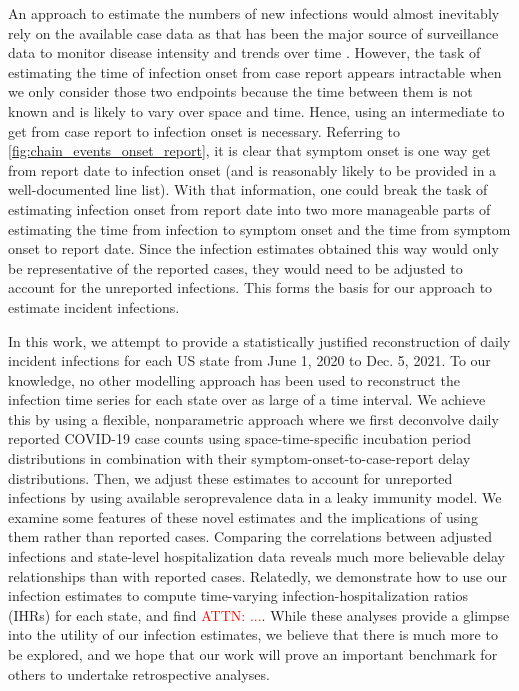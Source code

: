 \documentclass{article}
\newcommand{\attn}[1]{\textcolor{red}{ATTN: #1}}
\begin{document}
An approach to estimate the numbers of new infections would almost inevitably rely on the available case data as that has been the major source of surveillance data to monitor disease intensity and trends over time \citep{ecdc2020strategies}. However, the task of estimating the time of infection onset from case report appears intractable when we only consider those two endpoints because the time between them is not known and is likely to vary over space and time. Hence, using an intermediate to get from case report to infection onset is necessary. Referring to \autoref{fig:chain_events_onset_report}, it is clear that symptom onset is one way get from report date to infection onset (and is reasonably likely to be provided in a well-documented line list). With that information, one could break the task of estimating infection onset from report date into two more manageable parts of estimating the time from infection to symptom onset and the time from symptom onset to report date. Since the infection estimates obtained this way would only be representative of the reported cases, they would need to be adjusted to account for the unreported infections. This forms the basis for our approach to estimate incident infections.


In this work, we attempt to provide a statistically justified reconstruction of daily incident infections for each US state from June 1, 2020 to Dec. 5, 2021. To our knowledge, no other modelling approach has been used to reconstruct the infection time series for each state over as large of a time interval. We achieve this by using a flexible, nonparametric approach where we first deconvolve daily reported COVID-19 case counts using space-time-specific incubation period distributions in combination with their symptom-onset-to-case-report delay distributions. Then, we adjust these estimates to account for unreported infections by using available seroprevalence data in a leaky immunity model. We examine some features of these novel estimates and the implications of using them rather than reported cases. Comparing the correlations between adjusted infections and state-level hospitalization data reveals much more believable delay relationships than with reported cases. Relatedly, we demonstrate how to use our infection estimates to compute time-varying infection-hospitalization ratios (IHRs) for each state, and find \attn{...}. While these analyses provide a glimpse into the utility of our infection estimates, we believe that there is much more to be explored, and we hope that our work will prove an important benchmark for others to undertake retrospective analyses.
\end{document}
